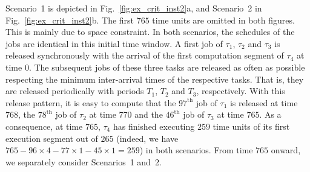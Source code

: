 Scenario~1 is depicted in Fig.~\ref{fig:ex_crit_inst2}a, and Scenario~2 in Fig.~\ref{fig:ex_crit_inst2}b. The first $765$ time units are omitted in both figures. This is mainly due to space constraint. In both scenarios, the schedules of the jobs are identical in this initial time window.  
A first job of $\tau_1$, $\tau_2$ and $\tau_3$ is released synchronously with the arrival of the first computation segment of $\tau_4$ at time $0$. The subsequent jobs of these three tasks are released as often as possible respecting the minimum inter-arrival times of the respective tasks. That is, they are released periodically with periods $T_1$, $T_2$ and $T_3$, respectively. With this release pattern, it is easy to compute that the $97^\text{th}$ job of $\tau_1$ is released at time $768$, the $78^\text{th}$ job of $\tau_2$ at time $770$ and the $46^\text{th}$ job of $\tau_3$ at time $765$. As a consequence, at time $765$, $\tau_4$ has finished executing $259$ time units of its first execution segment out of $265$ (indeed, we have $765 - 96 \times 4 - 77 \times 1 - 45 \times 1 = 259$) in both scenarios. From time $765$ onward, we separately consider Scenarios~1 and~2.

